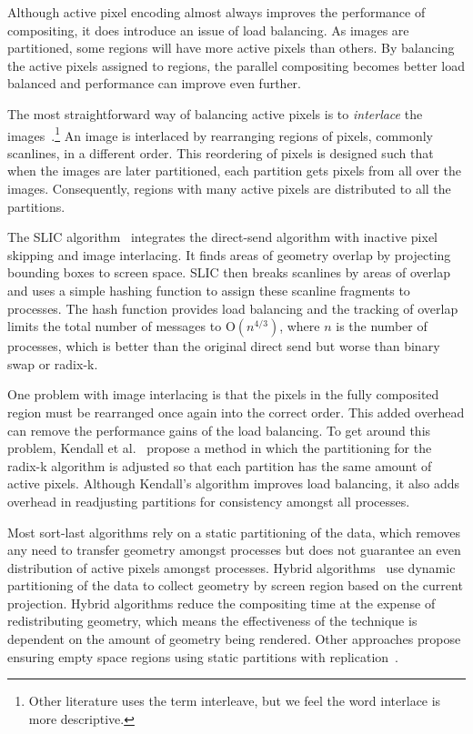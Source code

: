 \documentclass{acm_proc_article-sp}
\newcommand*{\lcite}[1]{~\cite{#1}}
\newcommand*{\scite}[1]{~\cite{#1}}
\newcommand{\etal}{et al.}
\newcommand*{\keyterm}[1]{\emph{#1}}
\newcommand{\Oh}{\mathrm{O}}
\begin{document}
Although active pixel encoding almost always improves the performance of
compositing, it does introduce an issue of load balancing.  As images are
partitioned, some regions will have more active pixels than others.  By
balancing the active pixels assigned to regions, the parallel compositing
becomes better load balanced and performance can improve even further.

The most straightforward way of balancing active pixels is to
\keyterm{interlace} the
images\lcite{Molnar1994,Takeuchi2003}.\footnote{Other literature uses the
  term interleave, but we feel the word interlace is more descriptive.}  An
image is interlaced by rearranging regions of pixels, commonly scanlines,
in a different order.  This reordering of pixels is designed such that when
the images are later partitioned, each partition gets pixels from all over
the images.  Consequently, regions with many active pixels are distributed
to all the partitions.

The SLIC algorithm\lcite{SLIC} integrates the direct-send algorithm with
inactive pixel skipping and image interlacing.  It finds areas of geometry
overlap by projecting bounding boxes to screen space.  SLIC then breaks
scanlines by areas of overlap and uses a simple hashing function to assign
these scanline fragments to processes.  The hash function provides load
balancing and the tracking of overlap limits the total number of messages
to $\Oh(n^{4/3})$, where $n$ is the number of processes, which is better
than the original direct send but worse than binary swap or radix-k.

One problem with image interlacing is that the pixels in the fully
composited region must be rearranged once again into the correct order.
This added overhead can remove the performance gains of the load balancing.
To get around this problem, Kendall \etal\scite{Kendall2010} propose a
method in which the partitioning for the radix-k algorithm is adjusted so
that each partition has the same amount of active pixels.  Although
Kendall's algorithm improves load balancing, it also adds overhead in
readjusting partitions for consistency amongst all processes.

Most sort-last algorithms rely on a static partitioning of the data, which
removes any need to transfer geometry amongst processes but does not
guarantee an even distribution of active pixels amongst processes.  Hybrid
algorithms\lcite{Samanta2000} use dynamic partitioning of the data to
collect geometry by screen region based on the current projection.  Hybrid
algorithms reduce the compositing time at the expense of redistributing
geometry, which means the effectiveness of the technique is dependent on
the amount of geometry being rendered.  Other approaches propose ensuring
empty space regions using static partitions with
replication\lcite{Samanta2001}.
\end{document}
